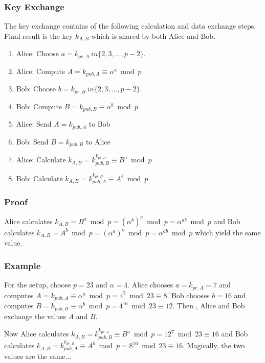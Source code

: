 \subsubsection{Key Exchange}

The key exchange contains of the following calculation and data exchange steps. Final result is the key $k_{A,B}$ which is shared by both Alice and Bob.

\begin{enumerate}
	\item Alice: Choose $a = k_{pr, A} \ in \{2,3,\ldots, p-2\}$.
	\item Alice: Compute $A = k_{pub, A} \equiv \alpha^a \bmod p$
	\item Bob: Choose $b = k_{pr, B} \ in \{2,3,\ldots, p-2\}$.
	\item Bob: Compute $B = k_{pub, B} \equiv \alpha^b \bmod p$
	\item Alice: Send $A = k_{pub, A}$ to Bob
	\item Bob: Send $B = k_{pub, B}$ to Alice
	\item Alice: Calculate $k_{A,B} = k_{pub, B}^{k_{pr, A}} \equiv B^a \bmod p$
	\item Bob: Calculate $k_{A,B} = k_{pub, A}^{k_{pr, B}} \equiv A^b \bmod p$
\end{enumerate}

\subsubsection{Proof}

Alice calculates $k_{A,B} = B^a \bmod p = (\alpha^b)^a \bmod p = \alpha^{ab} \bmod p$ and Bob calculates $k_{A,B} = A^b \bmod p = (\alpha^a)^b \bmod p = \alpha^{ab} \bmod p$ which yield the same value.

\subsubsection{Example}

For the setup, choose $p = 23$ and $\alpha= 4$. Alice chooses $a = k_{pr, A} = 7$ and computes $A = k_{pub, A} \equiv \alpha^a \bmod p = 4^7 \bmod 23 \equiv 8$. Bob chooses $b=16$ and computes $B = k_{pub, B} \equiv \alpha^b \bmod p = 4^{16} \bmod 23 \equiv 12$. Then , Alice and Bob exchange the values $A$ and $B$.

Now Alice calculates $k_{A,B} = k_{pub, B}^{k_{pr, A}} \equiv B^a \bmod p = 12^7 \bmod 23 \equiv 16$ and Bob calculates $k_{A,B} = k_{pub, A}^{k_{pr, B}} \equiv A^b \bmod p = 8^16 \bmod 23 \equiv 16$. Magically, the two values are the same...
